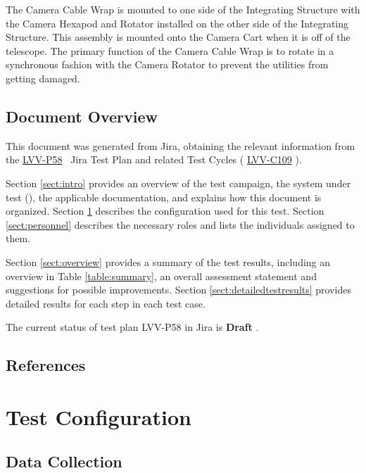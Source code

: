 \documentclass[SE,lsstdraft,STR,toc]{lsstdoc}
\begin{document}
The Camera Cable Wrap is mounted to one side of the Integrating
Structure with the Camera Hexapod and Rotator installed on the other
side of the Integrating Structure. This assembly is mounted onto the
Camera Cart when it is off of the telescope. The primary function of the
Camera Cable Wrap is to rotate in a synchronous fashion with the Camera
Rotator to prevent the utilities from getting damaged.


\subsection{Document Overview}
\label{sect:docoverview}

This document was generated from Jira, obtaining the relevant information from the 
\href{https://jira.lsstcorp.org/secure/Tests.jspa#/testPlan/LVV-P58}{LVV-P58}
~Jira Test Plan and related Test Cycles (
  \href{https://jira.lsstcorp.org/secure/Tests.jspa#/testCycle/LVV-C109}{LVV-C109}
).

Section \ref{sect:intro} provides an overview of the test campaign, the system under test (\product{}), the applicable documentation, and explains how this document is organized.
Section \ref{sect:configuration}  describes the configuration used for this test.
Section \ref{sect:personnel} describes the necessary roles and lists the individuals assigned to them.

Section \ref{sect:overview} provides a summary of the test results, including an overview in Table \ref{table:summary}, an overall assessment statement and suggestions for possible improvements.
Section \ref{sect:detailedtestresults} provides detailed results for each step in each test case.

The current status of test plan LVV-P58 in Jira is \textbf{ Draft }.

\subsection{References}
\label{sect:references}
\renewcommand{\refname}{}

\section{Test Configuration}
\label{sect:configuration}

\subsection{Data Collection}
\end{document}

